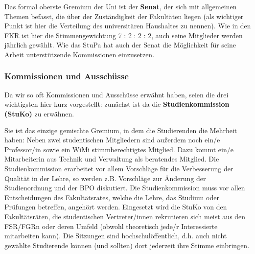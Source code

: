 Das formal oberste Gremium der Uni ist der \textbf{Senat}, der sich mit allgemeinen Themen befasst, die über der Zuständigkeit der Fakultäten liegen (als wichtiger Punkt ist hier die Verteilung des universitären Haushaltes zu nennen). Wie in den FKR ist hier die Stimmengewichtung 7 : 2 : 2 : 2, auch seine Mitglieder werden jährlich gewählt. Wie das StuPa hat auch der Senat die Möglichkeit für seine Arbeit unterstützende Kommissionen einzusetzen.

\subsubsection*{Kommissionen und Ausschüsse}

Da wir so oft Kommissionen und Ausschüsse erwähnt haben, seien die drei wichtigsten hier kurz vorgestellt: zunächst ist da die \textbf{Studienkommission (StuKo)} zu erwähnen.

Sie ist das einzige gemischte Gremium, in dem die Studierenden die Mehrheit haben: Neben zwei studentischen Mitgliedern sind außerdem noch ein/e Professor/in sowie ein WiMi stimmberechtigtes Mitglied. Dazu kommt ein/e Mitarbeiterin aus Technik und Verwaltung als beratendes Mitglied. Die Studienkommission erarbeitet vor allem Vorschläge für die Verbesserung der Qualität in der Lehre, so werden z.B. Vorschläge zur Änderung der
Studienordnung und der BPO diskutiert. Die Studienkommission muss vor allen Entscheidungen des Fakultätsrates, welche die Lehre, das Studium oder Prüfungen betreffen, angehört werden. Eingesetzt wird die StuKo von den
Fakultätsräten, die studentischen Vertreter/innen rekrutieren sich meist aus den FSR/FGRn oder deren Umfeld (obwohl theoretisch jede/r Interessierte mitarbeiten kann). Die Sitzungen sind hochschulöffentlich, d.h. auch nicht gewählte Studierende können (und sollten) dort jederzeit ihre Stimme einbringen.

